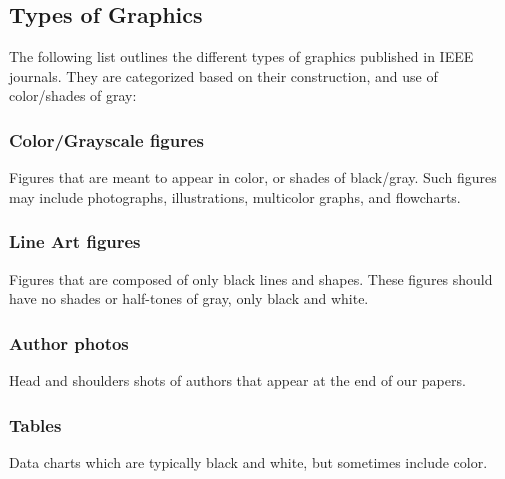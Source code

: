 \documentclass{ieeeaccess}
\begin{document}
\subsection{Types of Graphics}
The following list outlines the different types of graphics published in 
IEEE journals. They are categorized based on their construction, and use of 
color/shades of gray:

\subsubsection{Color/Grayscale figures}
{Figures that are meant to appear in color, or shades of black/gray. Such 
figures may include photographs, illustrations, multicolor graphs, and 
flowcharts.}

\subsubsection{Line Art figures}
{Figures that are composed of only black lines and shapes. These figures 
should have no shades or half-tones of gray, only black and white.}

\subsubsection{Author photos}
{Head and shoulders shots of authors that appear at the end of our papers. }

\subsubsection{Tables}
{Data charts which are typically black and white, but sometimes include 
color.}
\end{document}
